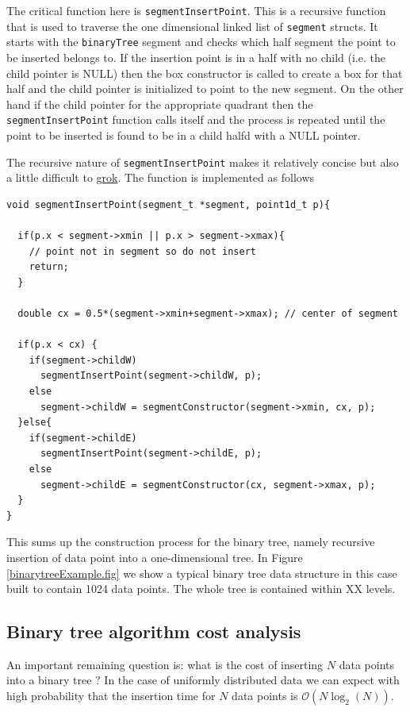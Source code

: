 The critical function here is \texttt{segmentInsertPoint}. This is a recursive function that is used to traverse the one dimensional linked list of \texttt{segment} structs. It starts with the \texttt{binaryTree} segment and checks which half segment the point to be inserted belongs to. If the insertion point is in a half with no child (i.e. the child pointer is NULL) then the box constructor is called to create a box for that half and the child pointer is initialized to point to the new segment. On the other hand if the child pointer for the appropriate quadrant then the \texttt{segmentInsertPoint} function calls itself and the process is repeated until the point to be inserted is found to be in a child halfd with a NULL pointer. 

The recursive nature of \texttt{segmentInsertPoint} makes it relatively concise but also a little difficult to \href{https://en.wikipedia.org/wiki/Grok}{grok}. The function is implemented as follows

\begin{verbatim}
void segmentInsertPoint(segment_t *segment, point1d_t p){

  if(p.x < segment->xmin || p.x > segment->xmax){
    // point not in segment so do not insert                                              
    return;
  }

  double cx = 0.5*(segment->xmin+segment->xmax); // center of segment                     

  if(p.x < cx) {
    if(segment->childW)
      segmentInsertPoint(segment->childW, p);
    else
      segment->childW = segmentConstructor(segment->xmin, cx, p);
  }else{
    if(segment->childE)
      segmentInsertPoint(segment->childE, p);
    else
      segment->childE = segmentConstructor(cx, segment->xmax, p);
  }
}
\end{verbatim}
This sums up the construction process for the binary tree, namely recursive insertion of data point into a one-dimensional tree. In Figure \ref{binarytreeExample.fig} we show a typical binary tree data structure in this case built to contain 1024 data points. The whole tree is contained within XX levels.

\subsection{Binary tree algorithm cost analysis}

An important remaining question is: what is the cost of inserting $N$ data points into a binary tree ? In the case of uniformly distributed data we can expect with high probability that the insertion time for $N$ data points is $\mathcal{O}(N\log_2(N))$. 

